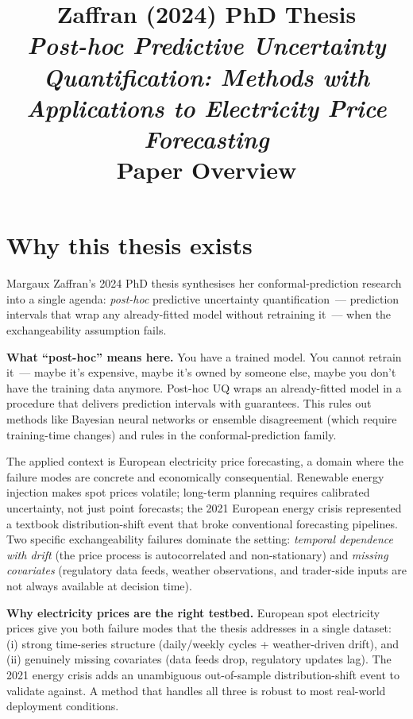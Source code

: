 \documentclass[letterpaper,11pt,leqno]{article}
\title{Zaffran (2024) PhD Thesis\\\textit{Post-hoc Predictive Uncertainty Quantification: Methods with Applications to Electricity Price Forecasting}\\[2pt]\large Paper Overview}
\author{}
\date{}
\begin{document}
\maketitle

\section{Why this thesis exists}\label{s:intro}

Margaux Zaffran's 2024 PhD thesis \cite{zaffran2024phd} synthesises her conformal-prediction research into a single agenda: \emph{post-hoc} predictive uncertainty quantification~--- prediction intervals that wrap any already-fitted model without retraining it~--- when the exchangeability assumption fails.

\begin{keyinsight}
\textbf{What ``post-hoc'' means here.} You have a trained model. You cannot retrain it~--- maybe it's expensive, maybe it's owned by someone else, maybe you don't have the training data anymore. Post-hoc UQ wraps an already-fitted model in a procedure that delivers prediction intervals with guarantees. This rules out methods like Bayesian neural networks or ensemble disagreement (which require training-time changes) and rules in the conformal-prediction family.
\end{keyinsight}

The applied context is European electricity price forecasting, a domain where the failure modes are concrete and economically consequential. Renewable energy injection makes spot prices volatile; long-term planning requires calibrated uncertainty, not just point forecasts; the 2021 European energy crisis represented a textbook distribution-shift event that broke conventional forecasting pipelines. Two specific exchangeability failures dominate the setting: \emph{temporal dependence with drift} (the price process is autocorrelated and non-stationary) and \emph{missing covariates} (regulatory data feeds, weather observations, and trader-side inputs are not always available at decision time).

\begin{explain}
\textbf{Why electricity prices are the right testbed.} European spot electricity prices give you both failure modes that the thesis addresses in a single dataset: (i) strong time-series structure (daily/weekly cycles + weather-driven drift), and (ii) genuinely missing covariates (data feeds drop, regulatory updates lag). The 2021 energy crisis adds an unambiguous out-of-sample distribution-shift event to validate against. A method that handles all three is robust to most real-world deployment conditions.
\end{explain}
\end{document}
